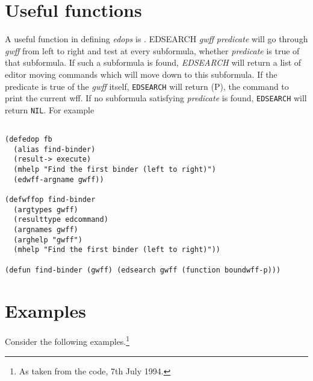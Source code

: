 \section{Useful functions}
A useful function in defining {\it edops} is .
{\wt EDSEARCH {\it gwff} {\it predicate}} will go through {\it gwff} from left
to right and test at every subformula, whether {\it predicate} is
true of that subformula.  If such a subformula is found, {\it EDSEARCH}
will return a list of editor moving commands which will move down
to this subformula.  If the predicate is true of the {\it gwff} itself,
{\tt EDSEARCH} will return {\wt (P)}, the command to print the current wff.
If no subformula satisfying
{\it predicate} is found, {\tt EDSEARCH} will return {\tt NIL}.  For example

\begin{verbatim}

(defedop fb
  (alias find-binder)
  (result-> execute)
  (mhelp "Find the first binder (left to right)")
  (edwff-argname gwff))

(defwffop find-binder
  (argtypes gwff)
  (resulttype edcommand)
  (argnames gwff)
  (arghelp "gwff")
  (mhelp "Find the first binder (left to right)"))

(defun find-binder (gwff) (edsearch gwff (function boundwff-p)))

\end{verbatim}

\section{Examples}

Consider the following examples.\footnote{As taken from the code, 7th July 1994.}

